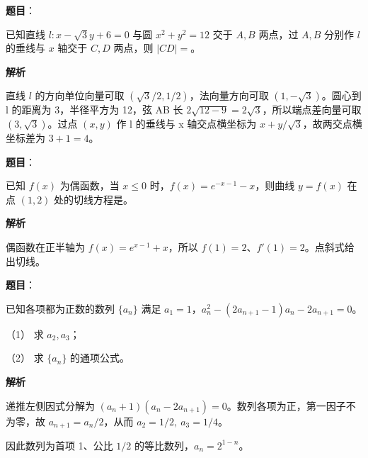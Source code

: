 \begin{answer}

\textbf{题目}：

已知直线 \(l:x-\sqrt3y+6=0\) 与圆 \(x^2+y^2=12\) 交于 \(A,B\) 两点，过 \(A,B\) 分别作 \(l\) 的垂线与 \(x\) 轴交于 \(C,D\) 两点，则 \(|CD|=\)\gkblank{}。

\textbf{解析}

直线 \(l\) 的方向单位向量可取 \((\sqrt3/2,1/2)\)，法向量方向可取 \((1,-\sqrt3)\)。圆心到 l 的距离为 3，半径平方为 12，弦 AB 长 \(2\sqrt{12-9}=2\sqrt3\)，所以端点差向量可取 \((3,\sqrt3)\)。过点 \((x,y)\) 作 l 的垂线与 x 轴交点横坐标为 \(x+y/\sqrt3\)，故两交点横坐标差为 \(3+1=4\)。


\end{answer}
\begin{answer}

\textbf{题目}：

已知 \(f(x)\) 为偶函数，当 \(x\leq0\) 时，\(f(x)=e^{-x-1}-x\)，则曲线 \(y=f(x)\) 在点 \((1,2)\) 处的切线方程是\gkblank{}。

\textbf{解析}

偶函数在正半轴为 \(f(x)=e^{x-1}+x\)，所以 \(f(1)=2\)、\(f'(1)=2\)。点斜式给出切线。


\end{answer}
\begin{answer}

\textbf{题目}：

已知各项都为正数的数列 \(\{a_n\}\) 满足 \(a_1=1\)，\(a_n^2-(2a_{n+1}-1)a_n-2a_{n+1}=0\)。

（1） 求 \(a_2,a_3\)；

（2） 求 \(\{a_n\}\) 的通项公式。

\textbf{解析}


递推左侧因式分解为 \((a_n+1)(a_n-2a_{n+1})=0\)。数列各项为正，第一因子不为零，故 \(a_{n+1}=a_n/2\)，从而 \(a_2=1/2,\ a_3=1/4\)。


因此数列为首项 1、公比 \(1/2\) 的等比数列，\(a_n=2^{1-n}\)。



\end{answer}
